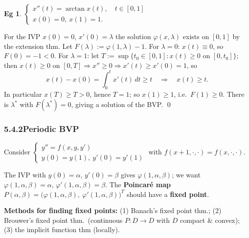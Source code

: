 \documentclass[11pt]{article}
\theoremstyle{definition}
\newtheorem*{example}{Eg}
\theoremstyle{remark}
\newcommand{\subsecn}[1]{\subsubsection*{#1}}
\begin{document}
\begin{example}
$\begin{cases} x''(t)=\arctan x(t),\quad t\in[0,1]\\ x(0)=0,\ x(1)=1. \end{cases}$

For the IVP $x(0)=0$, $x'(0)=\lambda$ the solution $\varphi(x,\lambda)$ exists on $[0,1]$ by the
extension thm. Let $F(\lambda):=\varphi(1,\lambda)-1$. For $\lambda=0$: $x(t)\equiv0$, so
$F(0)=-1<0$. For $\lambda=1$: let $T:=\sup\{t_0\in[0,1]:x(t)\ge0 \text{ on } [0,t_0]\}$; then
$x(t)\ge0$ on $[0,T] \Rightarrow x''\ge0 \Rightarrow x'(t)\ge x'(0)=1$, so
\[
x(t)-x(0)=\int_0^{t}x'(t)\,dt\ge t \quad\Rightarrow\quad x(t)\ge t.
\]
In particular $x(T)\ge T>0$, hence $T=1$; so $x(1)\ge1$, i.e.\ $F(1)\ge0$. There is $\lambda^*$ with
$F(\lambda^*)=0$, giving a solution of the BVP. \qed
\end{example}

\subsecn{5.4.2\quad Periodic BVP}

Consider $\begin{cases} y''=f(x,y,y')\\ y(0)=y(1),\ y'(0)=y'(1) \end{cases}$ with
$f(x+1,\cdot,\cdot)=f(x,\cdot,\cdot)$.

The IVP with $y(0)=\alpha$, $y'(0)=\beta$ gives $\varphi(1,\alpha,\beta)$; we want
$\varphi(1,\alpha,\beta)=\alpha$, $\varphi'(1,\alpha,\beta)=\beta$. The \textbf{Poincar\'e map}
$P(\alpha,\beta)=\bigl(\varphi(1,\alpha,\beta),\ \varphi'(1,\alpha,\beta)\bigr)^{T}$ should have a
\textbf{fixed point}.

\textbf{Methods for finding fixed points:} (1) Banach's fixed point thm.; (2) Brouwer's fixed point
thm.\ (continuous $P:D\to D$ with $D$ compact \& convex); (3) the implicit function thm (locally).
\end{document}
